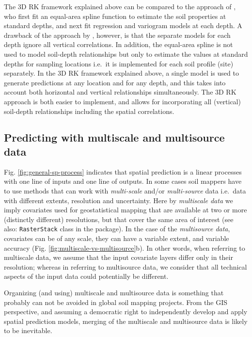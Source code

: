 \documentclass[graybox,natbib,nospthms,UStrade]{svmono}
\begin{document}
The 3D RK framework explained above can be compared to the approach of
\citet{Malone2009Geoderma}, who first fit an equal-area spline function to
estimate the soil properties at standard depths, and next fit
regression and variogram models at each depth. A drawback of the
approach by \citet{Malone2009Geoderma}, however, is that the separate models
for each depth ignore all vertical correlations. In addition, the
equal-area spline is not used to model soil-depth relationships but only
to estimate the values at standard depths for sampling locations i.e.~it
is implemented for each soil profile (site) separately. In the 3D RK
framework explained above, a single model is used to generate
predictions at any location and for any depth, and this takes into
account both horizontal and vertical relationships simultaneously. The
3D RK approach is both easier to implement, and allows for incorporating
all (vertical) soil-depth relationships including the spatial
correlations.

\hypertarget{multiscale}{%
\subsection{Predicting with multiscale and multisource data}\label{multiscale}}

Fig. \ref{fig:general-sp-process} indicates that spatial prediction is a
linear processes with one line of inputs and one line of outputs. In
some cases soil mappers have to use methods that can work with
\emph{multi-scale} and/or \emph{multi-source} data i.e.~data with different
extents, resolution and uncertainty. Here by \emph{multiscale data} we imply
covariates used for geostatistical mapping that are available at two or
more (distinctly different) resolutions, but that cover the same area of
interest (see also: \texttt{RasterStack} class in the package). In the case of
the \emph{multisource data}, covariates can be of any scale, they can have a
variable extent, and variable accuracy
(Fig. \ref{fig:multiscale-vs-multisource}b). In other words, when
referring to multiscale data, we assume that the input covariate layers
differ only in their resolution; whereas in referring to multisource data, we
consider that all technical aspects of the input data could potentially be
different.

Organizing (and using) multiscale and multisource data is something that
probably can not be avoided in global soil mapping projects. From the
GIS perspective, and assuming a democratic right to independently
develop and apply spatial prediction models, merging of the multiscale
and multisource data is likely to be inevitable.
\end{document}
